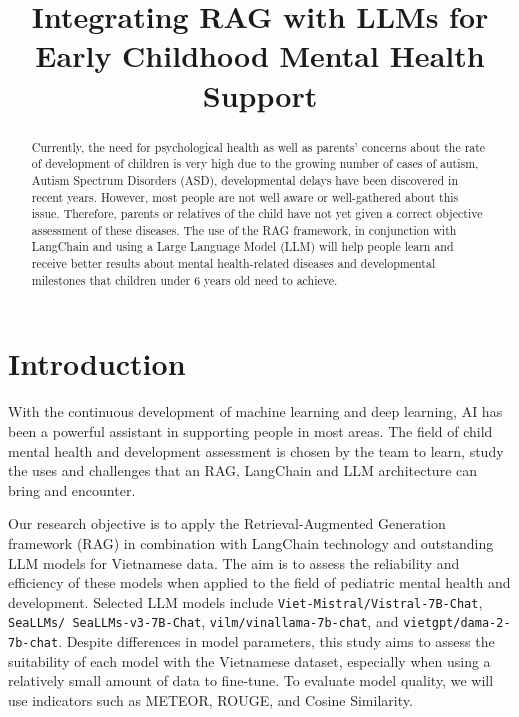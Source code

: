 \documentclass[runningheads]{llncs}
\begin{document}
\title{Integrating RAG with LLMs for Early Childhood Mental Health Support}

\author{}


\institute{}

\maketitle

\begin{abstract}
Currently, the need for psychological health as well as parents’ concerns about the rate of development of children is very high due to the growing number of cases of autism, Autism Spectrum Disorders (ASD), developmental delays have been discovered in recent years. However, most people are not well aware or well-gathered about this issue. Therefore, parents or relatives of the child have not yet given a correct objective assessment of these diseases. The use of the RAG framework, in conjunction with LangChain and using a Large Language Model (LLM) will help people learn and receive better results about mental health-related diseases and developmental milestones that children under 6 years old need to achieve.
\end{abstract}

\section{Introduction}
\label{sec:introduction}
With the continuous development of machine learning and deep learning, AI has been a powerful assistant in supporting people in most areas. The field of child mental health and development assessment is chosen by the team to learn, study the uses and challenges that an RAG, LangChain and LLM architecture can bring and encounter.

Our research objective is to apply the Retrieval-Augmented Generation framework (RAG) in combination with LangChain technology and outstanding LLM models for Vietnamese data. The aim is to assess the reliability and efficiency of these models when applied to the field of pediatric mental health and development. Selected LLM models include \texttt{Viet-Mistral/Vistral-7B-Chat}, \texttt{SeaLLMs/ SeaLLMs-v3-7B-Chat}, \texttt{vilm/vinallama-7b-chat}, and \texttt{vietgpt/dama-2-7b-chat}. Despite differences in model parameters, this study aims to assess the suitability of each model with the Vietnamese dataset, especially when using a relatively small amount of data to fine-tune. To evaluate model quality, we will use indicators such as METEOR, ROUGE, and Cosine Similarity.
\end{document}
